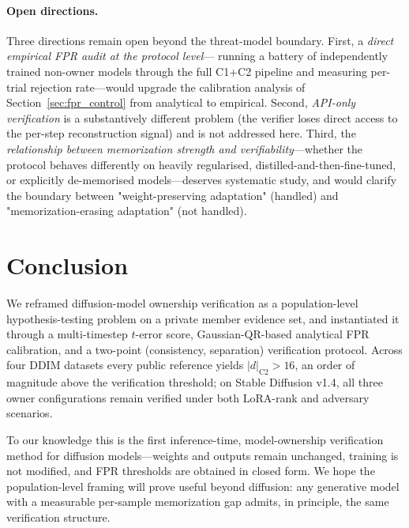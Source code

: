 \documentclass{article}
\begin{document}
\paragraph{Open directions.}
Three directions remain open beyond the threat-model boundary.
First, a \emph{direct empirical FPR audit at the protocol level}---
running a battery of independently trained non-owner models
through the full C1+C2 pipeline and measuring per-trial rejection
rate---would upgrade the calibration analysis of
Section~\ref{sec:fpr_control} from analytical to empirical.
Second, \emph{API-only verification} is a substantively different
problem (the verifier loses direct access to the per-step
reconstruction signal) and is not addressed here.
Third, the \emph{relationship between memorization strength and
verifiability}---whether the protocol behaves differently on
heavily regularised, distilled-and-then-fine-tuned, or
explicitly de-memorised models---deserves systematic study, and
would clarify the boundary between "weight-preserving adaptation"
(handled) and "memorization-erasing adaptation" (not handled).
\section{Conclusion}
\label{sec:conclusion}

We reframed diffusion-model ownership verification as a
population-level hypothesis-testing problem on a private member
evidence set, and instantiated it through a multi-timestep
$t$-error score, Gaussian-QR-based analytical FPR calibration,
and a two-point (consistency, separation) verification protocol.
Across four DDIM datasets every public reference yields
$|d|_{\text{C2}} > 16$, an order of magnitude above the
verification threshold; on Stable Diffusion v1.4, all three owner
configurations remain verified under both LoRA-rank and adversary
scenarios.

To our knowledge this is the first inference-time, model-ownership
verification method for diffusion models---weights and outputs
remain unchanged, training is not modified, and FPR thresholds
are obtained in closed form. We hope the population-level framing
will prove useful beyond diffusion: any generative model with a
measurable per-sample memorization gap admits, in principle, the
same verification structure.

\begin{ack}
\end{ack}
\end{document}
